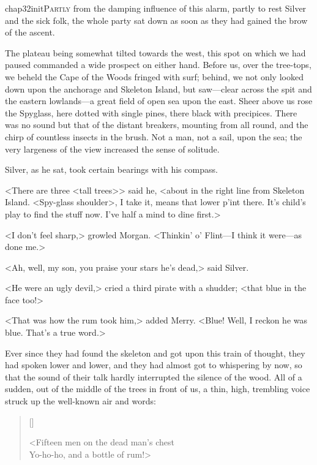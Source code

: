 
\lettrine{chap32initP}{artly} from the damping influence of this alarm, partly to rest Silver and the sick folk, the whole party sat down as soon as they had gained the brow of the ascent.

\zz
The plateau being somewhat tilted towards the west, this spot on which we had paused commanded a wide prospect on either hand. Before us, over the tree-tops, we beheld the Cape of the Woods fringed with surf; behind, we not only looked down upon the anchorage and Skeleton Island, but saw—clear across the spit and the eastern lowlands—a great field of open sea upon the east. Sheer above us rose the Spyglass, here dotted with single pines, there black with precipices. There was no sound but that of the distant breakers, mounting from all round, and the chirp of countless insects in the brush. Not a man, not a sail, upon the sea; the very largeness of the view increased the sense of solitude.

Silver, as he sat, took certain bearings with his compass.

<There are three <tall trees>> said he, <about in the right line from Skeleton Island. <Spy-glass shoulder>, I take it, means that lower p'int there. It's child's play to find the stuff now. I've half a mind to dine first.>

<I don't feel sharp,> growled Morgan. <Thinkin' o' Flint—I think it were—as done me.>

<Ah, well, my son, you praise your stars he's dead,> said Silver.

<He were an ugly devil,> cried a third pirate with a shudder; <that blue in the face too!>

<That was how the rum took him,> added Merry. <Blue! Well, I reckon he was blue. That's a true word.>

Ever since they had found the skeleton and got upon this train of thought, they had spoken lower and lower, and they had almost got to whispering by now, so that the sound of their talk hardly interrupted the silence of the wood. All of a sudden, out of the middle of the trees in front of us, a thin, high, trembling voice struck up the well-known air and words:

\settowidth{\versewidth}{Fifteen men on the dead man’s chest\longdash}
\begin{verse}[\versewidth]
\begin{altverse}
<Fifteen men on the dead man’s chest\longdash\\
Yo-ho-ho, and a bottle of rum!>
\end{altverse}
\end{verse}

